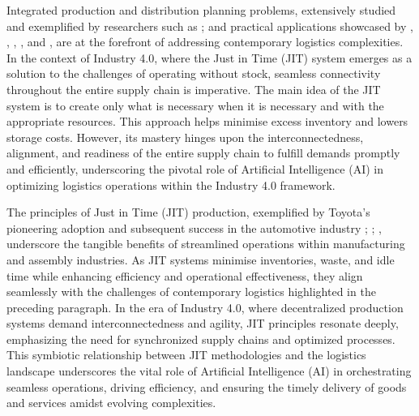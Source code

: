 \documentclass{article}
\begin{document}
Integrated production and distribution planning problems, extensively studied and exemplified by researchers such as \cite{chen2004integrated}; \citep{chen2010integrated} and practical applications showcased by \cite{ullrich2013integrated}, \cite{YAGMUR2024121586}, \cite{MOHAMMADI2020347}, \cite{boudia2008fast}, and \cite{tamannaei2019mathematical}, are at the forefront of addressing contemporary logistics complexities. In the context of Industry 4.0, where the Just in Time (JIT) system emerges as a solution to the challenges of operating without stock, seamless connectivity throughout the entire supply chain is imperative. The main idea of the JIT system is to create only what is necessary when it is necessary and with the appropriate resources. This approach helps minimise excess inventory and lowers storage costs. However, its mastery hinges upon the interconnectedness, alignment, and readiness of the entire supply chain to fulfill demands promptly and efficiently, underscoring the pivotal role of Artificial Intelligence (AI) in optimizing logistics operations within the Industry 4.0 framework.

The principles of Just in Time (JIT) production, exemplified by Toyota’s pioneering adoption and subsequent success in the automotive industry \cite{ghinato1995sistema}; \cite{monden2011toyota}; \cite{sugimori1977toyota}, underscore the tangible benefits of streamlined operations within manufacturing and assembly industries. As JIT systems minimise inventories, waste, and idle time while enhancing efficiency and operational effectiveness, they align seamlessly with the challenges of contemporary logistics highlighted in the preceding paragraph. In the era of Industry 4.0, where decentralized production systems demand interconnectedness and agility, JIT principles resonate deeply, emphasizing the need for synchronized supply chains and optimized processes. This symbiotic relationship between JIT methodologies and the logistics landscape underscores the vital role of Artificial Intelligence (AI) in orchestrating seamless operations, driving efficiency, and ensuring the timely delivery of goods and services amidst evolving complexities.
\end{document}
